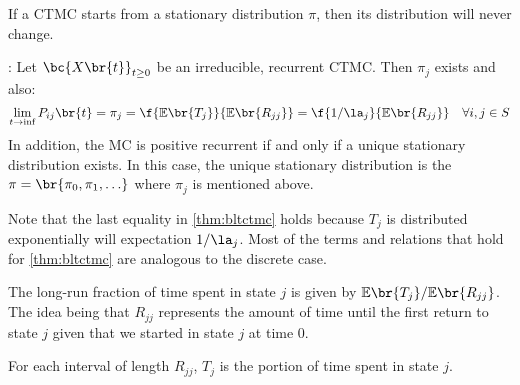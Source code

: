 \documentclass{article}
\newcommand{\Exp}{\mathbb{E}}
\begin{document}
    \begin{theorem}
        If a CTMC starts from a stationary distribution $\pi$, then its distribution will never change.
    \end{theorem}
    \begin{theorem}
        \label{thm:bltctmc}
        : Let $\bc{X\br{t}}_{t \geq 0}$ be an irreducible, recurrent CTMC. Then $\pi_{j}$ exists and also:
        \[ \lim_{t \to \inf} P_{ij}\br{t} = \pi_{j} = \f{\Exp\br{T_j}}{\Exp\br{R_{jj}}} = \f{1 / \la_{j}}{\Exp\br{R_{jj}}} \quad \forall i, j \in S \]
        In addition, the MC is positive recurrent if and only if a unique stationary distribution exists. In this case, the unique stationary distribution is the $\pi = \br{\pi_{0}, \pi_{1}, \ldots}$ where $\pi_j$ is mentioned above.
    \end{theorem}
    Note that the last equality in \cref{thm:bltctmc} holds because $T_{j}$ is distributed exponentially will expectation $1 / \la_j$. Most of the terms and relations that hold for \cref{thm:bltctmc} are analogous to the discrete case.
    \begin{remark}
        The long-run fraction of time spent in state $j$ is given by $\Exp\br{T_j}/ \Exp\br{R_{jj}}$. The idea being that $R_{jj}$ represents the amount of time until the first return to state $j$ given that we started in state $j$ at time $0$.
        \begin{center}
        \end{center}
        For each interval of length $R_{jj}$, $T_{j}$ is the portion of time spent in state $j$.
    \end{remark}
\end{document}
